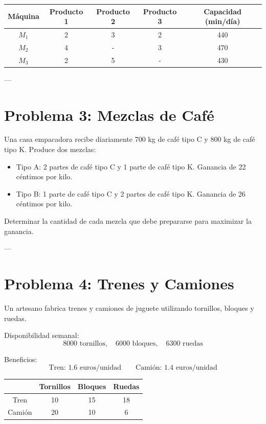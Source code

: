\documentclass[12pt]{article}
\begin{document}
\begin{center}
\begin{tabular}{|c|c|c|c|c|}
\hline
\textbf{Máquina} & Producto 1 & Producto 2 & Producto 3 & \textbf{Capacidad (min/día)} \\
\hline
$M_1$ & 2 & 3 & 2 & 440 \\
$M_2$ & 4 & - & 3 & 470 \\
$M_3$ & 2 & 5 & - & 430 \\
\hline
\end{tabular}
\end{center}

---

\section*{Problema 3: Mezclas de Café}

Una casa empacadora recibe diariamente 700 kg de café tipo C y 800 kg de café tipo K. Produce dos mezclas:

\begin{itemize}
\item Tipo A: 2 partes de café tipo C y 1 parte de café tipo K. Ganancia de 22 céntimos por kilo.
\item Tipo B: 1 parte de café tipo C y 2 partes de café tipo K. Ganancia de 26 céntimos por kilo.
\end{itemize}

Determinar la cantidad de cada mezcla que debe prepararse para maximizar la ganancia.

---

\section*{Problema 4: Trenes y Camiones}

Un artesano fabrica trenes y camiones de juguete utilizando tornillos, bloques y ruedas.

Disponibilidad semanal:
\[
8000 \text{ tornillos}, \quad 6000 \text{ bloques}, \quad 6300 \text{ ruedas}
\]

Beneficios:
\[
\text{Tren: } 1.6 \text{ euros/unidad} \qquad
\text{Camión: } 1.4 \text{ euros/unidad}
\]

\begin{center}
\begin{tabular}{|c|c|c|c|}
\hline
 & Tornillos & Bloques & Ruedas \\
\hline
Tren & 10 & 15 & 18 \\
Camión & 20 & 10 & 6 \\
\hline
\end{tabular}
\end{center}
\end{document}
